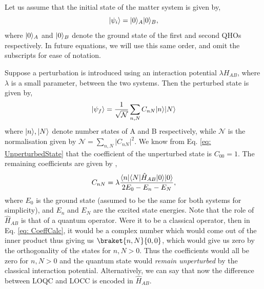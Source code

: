 \documentclass[12pt,a4paper]{report}
\theoremstyle{plain}
\theoremstyle{definition}
\theoremstyle{remark}
\DeclarePairedDelimiter\bra{\langle}{\rvert}
\DeclarePairedDelimiter\ket{\lvert}{\rangle}
\begin{document}
Let us assume that the initial state of the matter system is given by,
\begin{equation}
    \ket{\psi_i} = \ket{0}_A\ket{0}_B,
    \label{eq: UnperturbedState}
\end{equation}
where $\ket{0}_A$ and $\ket{0}_B$ denote the ground state of the first and second  QHOs respectively. In future equations, we will use this same order, and omit the subscripts for ease of notation.

Suppose a perturbation is introduced using an interaction potential $\lambda H_{AB}$, where $\lambda$ is a small parameter, between the two systems. Then the perturbed state is given by,
\begin{equation}
    \ket{\psi_f} = \frac{1}{\sqrt{\mathcal{N}}} \sum_{n,N} C_{nN} \ket{n}\ket{N} 
    \label{eq: FinalState}
\end{equation}
where $\ket{n}, \ket{N}$ denote number states of A and B respectively, while $\mathcal{N}$ is the normalisation given by $\mathcal{N} = \sum_{n,N} |C_{nN}|^2$. We know from Eq. \ref{eq: UnperturbedState} that the coefficient of the unperturbed state is $C_{00} = 1$. The remaining coefficients are given by \cite{Bose_2022, Bala_2012},
\begin{equation}
    C_{nN} = \lambda\frac{\bra{n}\bra{N}\hat{H}_{AB}\ket{0}\ket{0}}{2E_0 - E_n - E_N},
    \label{eq: CoeffCalc}
\end{equation}
where $E_0$ is the ground state (assumed to be the same for both systems for simplicity), and $E_n$ and $E_N$ are the excited state energies. Note that the role of $\hat{H}_{AB}$ is that of a quantum operator. Were it to be a classical operator, then in Eq. \ref{eq: CoeffCalc}, it would be a complex number which would come out of the inner product thus giving us $\braket{n, N}{0, 0}$, which would give us zero by the orthogonality of the states for $n, N > 0$. Thus the coefficients would all be zero for $n,N > 0$ and the quantum state would \textit{remain unperturbed} by the classical interaction potential. Alternatively, we can say that now the difference between LOQC and LOCC is encoded in $\hat{H}_{AB}$.
\end{document}
